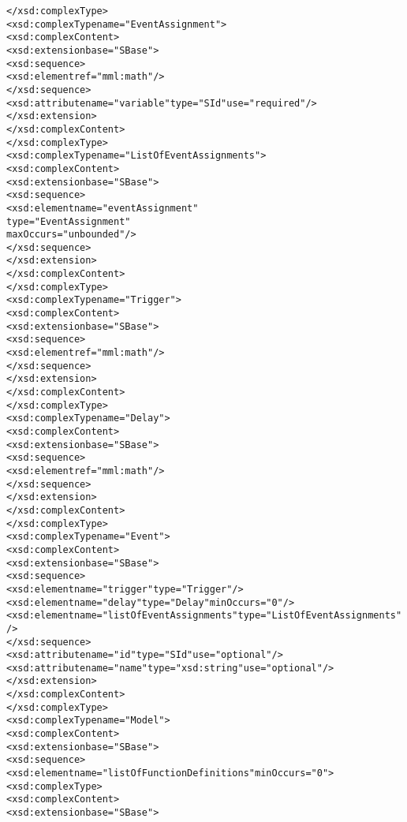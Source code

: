 \begin{alltt}
    </xsd:complexType>
    <xsd:complexType name="EventAssignment">
        <xsd:complexContent>
            <xsd:extension base="SBase">
                <xsd:sequence>
                    <xsd:element ref="mml:math"/>
                </xsd:sequence>
                <xsd:attribute name="variable" type="SId" use="required"/>
            </xsd:extension>
        </xsd:complexContent>
    </xsd:complexType>
    <xsd:complexType name="ListOfEventAssignments">
        <xsd:complexContent>
            <xsd:extension base="SBase">
                <xsd:sequence>
                    <xsd:element name="eventAssignment"
                                 type="EventAssignment" 
                                 maxOccurs="unbounded"/>
                </xsd:sequence>
            </xsd:extension>
        </xsd:complexContent>
    </xsd:complexType>
    <xsd:complexType name="Trigger">
        <xsd:complexContent>
            <xsd:extension base="SBase">
                <xsd:sequence>
                    <xsd:element ref="mml:math"/>
                </xsd:sequence>
            </xsd:extension>
        </xsd:complexContent>
    </xsd:complexType>
    <xsd:complexType name="Delay">
        <xsd:complexContent>
            <xsd:extension base="SBase">
                <xsd:sequence>
                    <xsd:element ref="mml:math"/>
                </xsd:sequence>
            </xsd:extension>
        </xsd:complexContent>
    </xsd:complexType>
    <xsd:complexType name="Event">
        <xsd:complexContent>
            <xsd:extension base="SBase">
                <xsd:sequence>
                    <xsd:element name="trigger" type="Trigger"/>
                    <xsd:element name="delay" type="Delay" minOccurs="0"/>
                    <xsd:element name="listOfEventAssignments" type="ListOfEventAssignments"/>
                </xsd:sequence>
                <xsd:attribute name="id" type="SId" use="optional"/>
                <xsd:attribute name="name" type="xsd:string" use="optional"/>
            </xsd:extension>
        </xsd:complexContent>
    </xsd:complexType>
    <xsd:complexType name="Model">
        <xsd:complexContent>
            <xsd:extension base="SBase">
                <xsd:sequence>
                    <xsd:element name="listOfFunctionDefinitions" minOccurs="0">
                        <xsd:complexType>
                            <xsd:complexContent>
                                <xsd:extension base="SBase">

\end{alltt}
